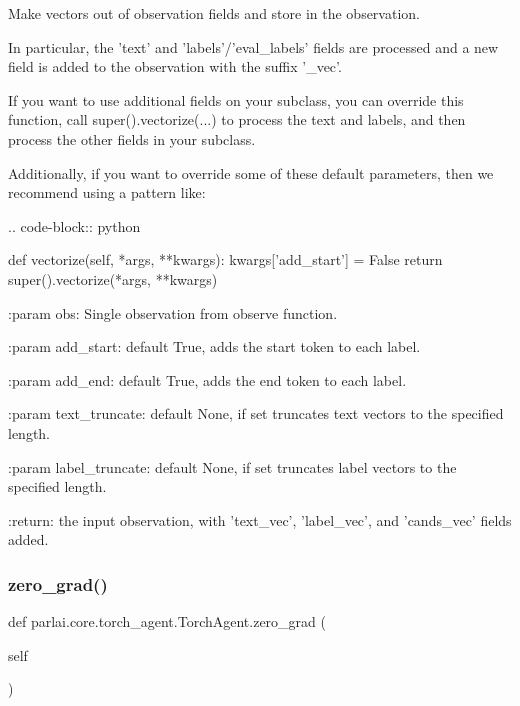 \begin{DoxyVerb}Make vectors out of observation fields and store in the observation.

In particular, the 'text' and 'labels'/'eval_labels' fields are
processed and a new field is added to the observation with the suffix
'_vec'.

If you want to use additional fields on your subclass, you can override
this function, call super().vectorize(...) to process the text and
labels, and then process the other fields in your subclass.

Additionally, if you want to override some of these default parameters,
then we recommend using a pattern like:

.. code-block:: python

  def vectorize(self, *args, **kwargs):
      kwargs['add_start'] = False
      return super().vectorize(*args, **kwargs)


:param obs:
    Single observation from observe function.

:param add_start:
    default True, adds the start token to each label.

:param add_end:
    default True, adds the end token to each label.

:param text_truncate:
    default None, if set truncates text vectors to the specified
    length.

:param label_truncate:
    default None, if set truncates label vectors to the specified
    length.

:return:
    the input observation, with 'text_vec', 'label_vec', and
    'cands_vec' fields added.
\end{DoxyVerb}
 \mbox{\label{classparlai_1_1core_1_1torch__agent_1_1TorchAgent_a91c163f3e2d39b380095b7083f673b6e}} 
\subsubsection{\texorpdfstring{zero\+\_\+grad()}{zero\_grad()}}
{\footnotesize\ttfamily def parlai.\+core.\+torch\+\_\+agent.\+Torch\+Agent.\+zero\+\_\+grad (\begin{DoxyParamCaption}\item[{}]{self }\end{DoxyParamCaption})}


